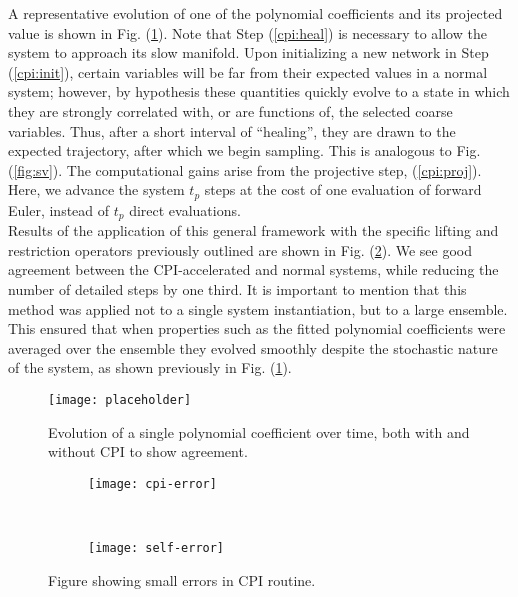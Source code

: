 \documentclass[12pt]{article}
\begin{document}
\begin{onehalfspace}
A representative evolution of one of the polynomial coefficients and its projected value is shown in Fig. (\ref{fig:coeff-evo}). Note that Step (\ref{cpi:heal}) is necessary to allow the system to approach its slow manifold. Upon initializing a new network in Step (\ref{cpi:init}), certain variables will be far from their expected values in a normal system; however, by hypothesis these quantities quickly evolve to a state in which they are strongly correlated with, or are functions of, the selected coarse variables. Thus, after a short interval of ``healing'', they are drawn to the expected trajectory, after which we begin sampling. This is analogous to Fig. (\ref{fig:sv}). The computational gains arise from the projective step, (\ref{cpi:proj}). Here, we advance the system $t_p$ steps at the cost of one evaluation of forward Euler, instead of $t_p$ direct evaluations. \\

Results of the application of this general framework with the specific lifting and restriction operators previously outlined are shown in Fig. (\ref{fig:cpi-results}). We see good agreement between the CPI-accelerated and normal systems, while reducing the number of detailed steps by one third. It is important to mention that this method was applied not to a single system instantiation, but to a large ensemble. This ensured that when properties such as the fitted polynomial coefficients were averaged over the ensemble they evolved smoothly despite the stochastic nature of the system, as shown previously in Fig. (\ref{fig:coeff-evo}).

\begin{figure}[ht!]
  \centering
  \texttt{[image: placeholder]}
  \caption{Evolution of a single polynomial coefficient over time, both with and without CPI to show agreement. \label{fig:coeff-evo}}
\end{figure}

\begin{figure}[h!]
  \vspace{-5mm}
  \centering
  \begin{subfigure}{0.75\textwidth}
    \centering
    \texttt{[image: cpi-error]}
  \end{subfigure} \\ %
  \begin{subfigure}{0.75\textwidth}
    \centering
    \texttt{[image: self-error]}
  \end{subfigure}%
  \caption{Figure showing small errors in CPI routine. \label{fig:cpi-results}}
\end{figure}



\end{onehalfspace}
\end{document}
